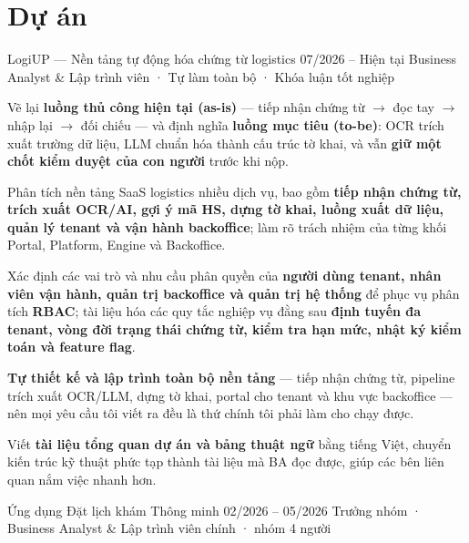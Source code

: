 \documentclass[a4paper,9pt]{extarticle}
\begin{document}
\section{Dự án}

\cvHeading
  {LogiUP — Nền tảng tự động hóa chứng từ logistics}
  {07/2026 -- Hiện tại}
  {Business Analyst \& Lập trình viên · Tự làm toàn bộ · Khóa luận tốt nghiệp}


\begin{cvBullets}
  \item Vẽ lại \textbf{luồng thủ công hiện tại (as-is)} — tiếp nhận chứng từ $\rightarrow$ đọc tay $\rightarrow$ nhập lại $\rightarrow$ đối chiếu — và định nghĩa \textbf{luồng mục tiêu (to-be)}: OCR trích xuất trường dữ liệu, LLM chuẩn hóa thành cấu trúc tờ khai, và vẫn \textbf{giữ một chốt kiểm duyệt của con người} trước khi nộp.
  \item Phân tích nền tảng SaaS logistics nhiều dịch vụ, bao gồm \textbf{tiếp nhận chứng từ, trích xuất OCR/AI, gợi ý mã HS, dựng tờ khai, luồng xuất dữ liệu, quản lý tenant và vận hành backoffice}; làm rõ trách nhiệm của từng khối Portal, Platform, Engine và Backoffice.
  \item Xác định các vai trò và nhu cầu phân quyền của \textbf{người dùng tenant, nhân viên vận hành, quản trị backoffice và quản trị hệ thống} để phục vụ phân tích \textbf{RBAC}; tài liệu hóa các quy tắc nghiệp vụ đằng sau \textbf{định tuyến đa tenant, vòng đời trạng thái chứng từ, kiểm tra hạn mức, nhật ký kiểm toán và feature flag}.
  \item \textbf{Tự thiết kế và lập trình toàn bộ nền tảng} — tiếp nhận chứng từ, pipeline trích xuất OCR/LLM, dựng tờ khai, portal cho tenant và khu vực backoffice — nên mọi yêu cầu tôi viết ra đều là thứ chính tôi phải làm cho chạy được.
  \item Viết \textbf{tài liệu tổng quan dự án và bảng thuật ngữ} bằng tiếng Việt, chuyển kiến trúc kỹ thuật phức tạp thành tài liệu mà BA đọc được, giúp các bên liên quan nắm việc nhanh hơn.
\end{cvBullets}

\vspace{4pt}

\cvHeading
  {Ứng dụng Đặt lịch khám Thông minh}
  {02/2026 -- 05/2026}
  {Trưởng nhóm · Business Analyst \& Lập trình viên chính · nhóm 4 người}
\end{document}
